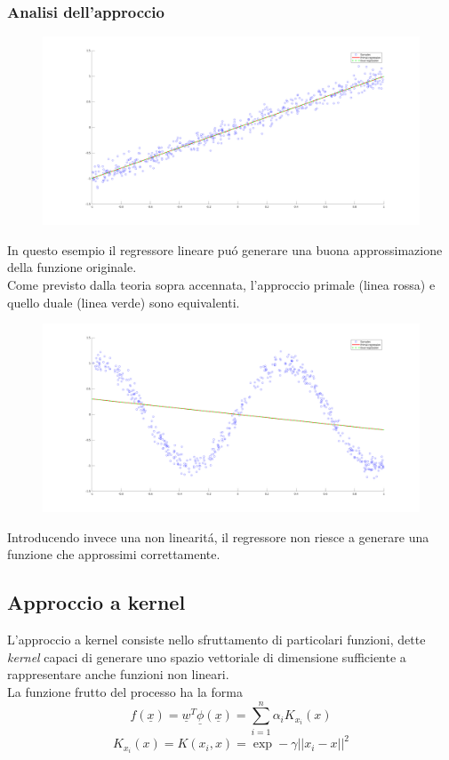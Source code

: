 \documentclass[12pt]{article}
\begin{document}
\subsubsection{Analisi dell'approccio}
\begin{figure}[H]
  \centering
  \includegraphics[width=\textwidth]{images/LinearRegressionLine}
\end{figure}
In questo esempio il regressore lineare puó generare una buona approssimazione della funzione originale. \\
Come previsto dalla teoria sopra accennata, l'approccio primale (linea rossa) e quello duale (linea verde) sono equivalenti.
\begin{figure}[H]
  \centering
  \includegraphics[width=\textwidth]{images/LinearRegressionSine}
\end{figure}
Introducendo invece una non linearitá, il regressore non riesce a generare una funzione
che approssimi correttamente.

\newpage
\subsection{Approccio a kernel}
L'approccio a kernel consiste nello sfruttamento di particolari funzioni, dette \textit{kernel}
capaci di generare uno spazio vettoriale di dimensione sufficiente a rappresentare anche funzioni non lineari. \\
La funzione frutto del processo ha la forma
$$
  f(\underline{x}) = \underline{w}^T \underline{\phi}(\underline{x})
                   = \sum_{i=1}^n \alpha_i K_{x_i}(x)
$$
$$
  K_{x_i}(x) = K(x_i, x) = \exp - \gamma || x_i - x ||^2
$$
\end{document}
